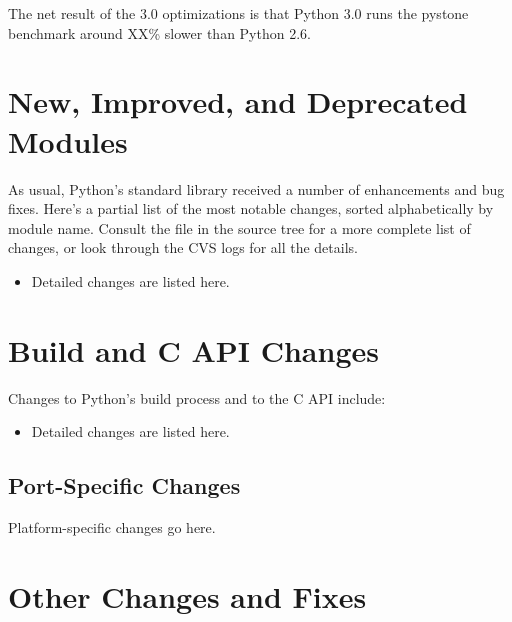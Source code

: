 \documentclass{howto}
\begin{document}
The net result of the 3.0 optimizations is that Python 3.0 runs the
pystone benchmark around XX\% slower than Python 2.6.


\section{New, Improved, and Deprecated Modules}

As usual, Python's standard library received a number of enhancements and
bug fixes.  Here's a partial list of the most notable changes, sorted
alphabetically by module name. Consult the
 file in the source tree for a more
complete list of changes, or look through the CVS logs for all the
details.

\begin{itemize}

\item Detailed changes are listed here.

\end{itemize}




\section{Build and C API Changes}

Changes to Python's build process and to the C API include:

\begin{itemize}

\item Detailed changes are listed here.

\end{itemize}


\subsection{Port-Specific Changes}

Platform-specific changes go here.


\section{Other Changes and Fixes \label{section-other}}
\end{document}
